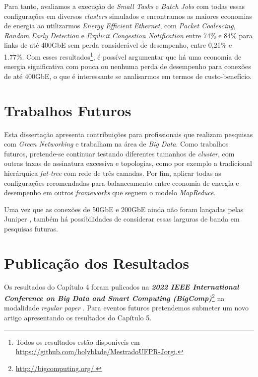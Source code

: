 Para tanto, avaliamos a execução de \emph{Small Tasks} e \emph{Batch Jobs} com todas essas configurações em diversos \emph{clusters} simulados e encontramos as maiores economias de energia ao utilizarmos \emph{Energy Efficient Ethernet}, com \emph{Packet Coalescing}, \emph{Random Early Detection} e \emph{Explicit Congestion Notification} entre 74\% e 84\% para links de até 400GbE sem perda considerável de desempenho, entre 0,21\% e 1.77\%. Com esses resultados\footnote{Todos os resultados estão disponíveis em \href{https://github.com/holyblade/MestradoUFPR-Jorgi}{https://github.com/holyblade/MestradoUFPR-Jorgi.}}, é possível argumentar que há uma economia de energia significativa com pouca ou nenhuma perda de desempenho para conexões de até 400GbE, o que é interessante se analisarmos em termos de custo-benefício.

\section{Trabalhos Futuros}

Esta dissertação apresenta contribuições para profissionais que realizam pesquisas com \emph{Green Networking} e trabalham na área de \emph{Big Data}. Como trabalhos futuros, pretende-se continuar testando diferentes tamanhos de \emph{cluster}, com outras taxas de assinatura excessiva e topologias, como por exemplo a tradicional hierárquica \emph{fat-tree} com rede de três camadas. Por fim, aplicar todas as configurações recomendadas para balanceamento entre economia de energia e desempenho em outros \emph{frameworks} que seguem o modelo \emph{MapReduce}.

Uma vez que as conexões de 50GbE e 200GbE ainda não foram lançadas pelas Juniper \cite{QFX5220Guide}, também há possibilidades de considerar essas larguras de banda em pesquisas futuras.

\section{Publicação dos Resultados}

Os resultados do Capítulo 4 foram pulicados na \emph{\textbf{2022 IEEE International Conference on Big Data and Smart Computing (BigComp)}}\footnote{\href{http://www.bigcomputing.org/}{http://bigcomputing.org/.}} na modalidade \emph{regular paper} \cite{dias2022reducing}. Para eventos futuros pretendemos submeter um novo artigo apresentando os resultados do Capítulo 5.
